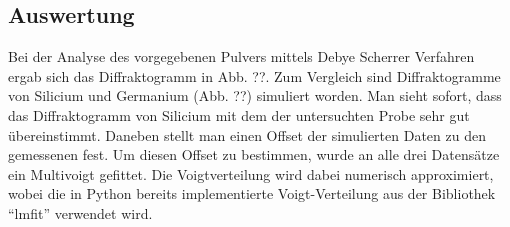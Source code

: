 \subsection{Auswertung}
Bei der Analyse des vorgegebenen Pulvers mittels Debye Scherrer Verfahren ergab sich das Diffraktogramm in Abb. ??. Zum Vergleich sind Diffraktogramme von Silicium und Germanium (Abb. ??) simuliert worden. Man sieht sofort, dass das Diffraktogramm von Silicium mit dem der untersuchten Probe sehr gut übereinstimmt. Daneben stellt man einen Offset der simulierten Daten zu den gemessenen fest. Um diesen Offset zu bestimmen, wurde an alle drei Datensätze ein Multivoigt gefittet. Die Voigtverteilung wird dabei numerisch approximiert, wobei die in Python bereits implementierte Voigt-Verteilung aus der Bibliothek "`lmfit"' verwendet wird.